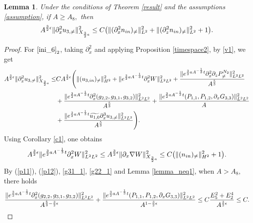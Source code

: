 \documentclass[12pt, reqno]{amsart}
\newtheorem{lemma}{Lemma}[section]
\numberwithin{equation}{section}
\begin{document}
	\begin{lemma}\label{c2}
		Under the conditions of Theorem \ref{result} and the assumptions \eqref{assumption}, 
		if $A\geq A_8,$ then 
		\begin{equation*}
			A^{\frac32\epsilon}\|\partial_x^2u_{3,\neq}\|^2_{X_{\frac32a}}\leq C\big(\|(\partial_x^2n_{\rm in})_{\neq}\|^2_{L^2}
			+\|(\partial_z^2n_{\rm in})_{\neq}\|^2_{L^2}+1\big).
		\end{equation*}
	\end{lemma}
	\begin{proof}
		For $\eqref{ini_6}_2$, taking $\partial_x^2$ and applying Proposition
		\ref{timespace2}, by \eqref{v1}, we get 
		\begin{equation*}
			\begin{aligned}
				A^{\frac32\epsilon}\|\partial_x^2u_{3,\neq}\|^2_{X_{\frac32a}}
				\leq& CA^{\frac32\epsilon}\Bigg(\|(u_{3,\rm in})_{\neq}\|_{H^2}^2+\|{\rm e}^{\frac32aA^{-\frac{1}{3}}t}
				\partial_x^2W\|^2_{L^2L^2}
				+\frac{\|{\rm e}^{\frac32aA^{-\frac{1}{3}}t}
					\partial_x^2\partial_zP^{N_2}_{\neq}\|^2_{L^2L^2}}
				{A^{\frac{5}{3}}}\\
				&+\frac{\|{\rm e}^{\frac32aA^{-\frac{1}{3}}t}
					\partial_x^2(g_{2,2},g_{3,1},g_{3,2})\|^2_{L^2L^2}}
				{A^{\frac53}}
				+\frac{\|{\rm e}^{\frac32aA^{-\frac{1}{3}}t}
					(P_{1,1},P_{1,2},\partial_{x}G_{3,3})\|^2_{L^2L^2}}{A}\\&+\frac{\|e^{\frac32aA^{-\frac13}t}\widetilde{ u_{1,0}}\partial_{x}^{3}u_{3,\neq}\|_{L^{2}L^{2}}^{2}}{A^{\frac53}}\Bigg).
			\end{aligned}	
		\end{equation*}
		Using Corollary \ref{c1}, one obtains
		\begin{equation*}
			A^{\frac32\epsilon}\|{\rm e}^{\frac32aA^{-\frac{1}{3}}t}
			\partial_x^2W\|^2_{L^2L^2}\leq 
			A^{\frac32\epsilon}\|\partial_x\nabla W\|^2_{X_{\frac32a}}
			\leq C\big(\|(n_{\rm in})_{\neq}\|^2_{H^2}+1\big).
		\end{equation*}
		By  (\ref{p11}), (\ref{p12}), \eqref{g31_1}, \eqref{g22_1}
		and Lemma \ref{lemma_neq1}, when $A>A_8,$
		there holds
		\begin{equation*}
			\frac{\|{\rm e}^{\frac32aA^{-\frac{1}{3}}t}
				\partial_x^2(g_{2,2},g_{3,1},g_{3,2})\|^2_{L^2L^2}}
			{A^{\frac53-\frac32\epsilon}}\\
			+\frac{\|{\rm e}^{\frac32aA^{-\frac{1}{3}}t}
				(P_{1,1},P_{1,2},\partial_xG_{3,3})\|^2_{L^2L^2}}
			{A^{1-\frac32\epsilon}}
			\leq C\frac{E_5^2+E_2^4}{A^{\frac32\epsilon}}\leq C.

\end{equation*}
\end{proof}
\end{document}
